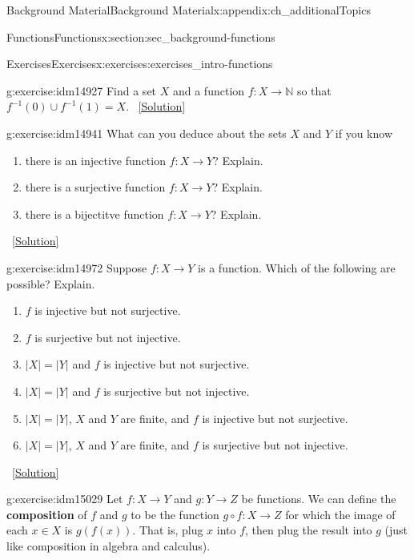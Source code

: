 \documentclass[oneside,10pt,]{book}
\newcommand{\terminology}[1]{\textbf{#1}}
\numberwithin{equation}{chapter}
\def\N{\mathbb N}
\def\inv{^{-1}}
\begin{document}
\begin{appendixptx}{Background Material}{}{Background Material}{}{}{x:appendix:ch_additionalTopics}
\begin{sectionptx}{Functions}{}{Functions}{}{}{x:section:sec_background-functions}
\begin{exercises-subsection}{Exercises}{}{Exercises}{}{}{x:exercises:exercises_intro-functions}
\begin{divisionexercise}{10}{}{}{g:exercise:idm14927}%
Find a set \(X\) and a function \(f:X \to \N\) so that \(f\inv(0) \cup f\inv(1) = X\).%
\qquad~\hfill{\tiny\hyperlink{g:solution:idm14933-main}{[Solution]}}\end{divisionexercise}%
\begin{divisionexercise}{11}{}{}{g:exercise:idm14941}%
What can you deduce about the sets \(X\) and \(Y\) if you know \textellipsis{}%
\begin{enumerate}[label=(\alph*)]
\item{}there is an injective function \(f:X \to Y\)? Explain.%
\item{}there is a surjective function \(f:X \to Y\)? Explain.%
\item{}there is a bijectitve function \(f:X \to Y\)? Explain.%
\end{enumerate}
%
\qquad~\hfill{\tiny\hyperlink{g:solution:idm14957-main}{[Solution]}}\end{divisionexercise}%
\begin{divisionexercise}{12}{}{}{g:exercise:idm14972}%
Suppose \(f:X \to Y\) is a function. Which of the following are possible? Explain.%
\begin{enumerate}[label=(\alph*)]
\item{}\(f\) is injective but not surjective.%
\item{}\(f\) is surjective but not injective.%
\item{}\(|X| = |Y|\) and \(f\) is injective but not surjective.%
\item{}\(|X| = |Y|\) and \(f\) is surjective but not injective.%
\item{}\(|X| = |Y|\), \(X\) and \(Y\) are finite, and \(f\) is injective but not surjective.%
\item{}\(|X| = |Y|\), \(X\) and \(Y\) are finite, and \(f\) is surjective but not injective.%
\end{enumerate}
%
\qquad~\hfill{\tiny\hyperlink{g:solution:idm14997-main}{[Solution]}}\end{divisionexercise}%
\begin{divisionexercise}{13}{}{}{g:exercise:idm15029}%
Let \(f:X \to Y\) and \(g:Y \to Z\) be functions.  We can define the \terminology{composition} of \(f\) and \(g\) to be the function \(g\circ f:X \to Z\) for which the image of each \(x \in X\) is \(g(f(x))\).  That is, plug \(x\) into \(f\), then plug the result into \(g\) (just like composition in algebra and calculus).%
\par

\end{divisionexercise}
\end{exercises-subsection}
\end{sectionptx}
\end{appendixptx}
\end{document}
